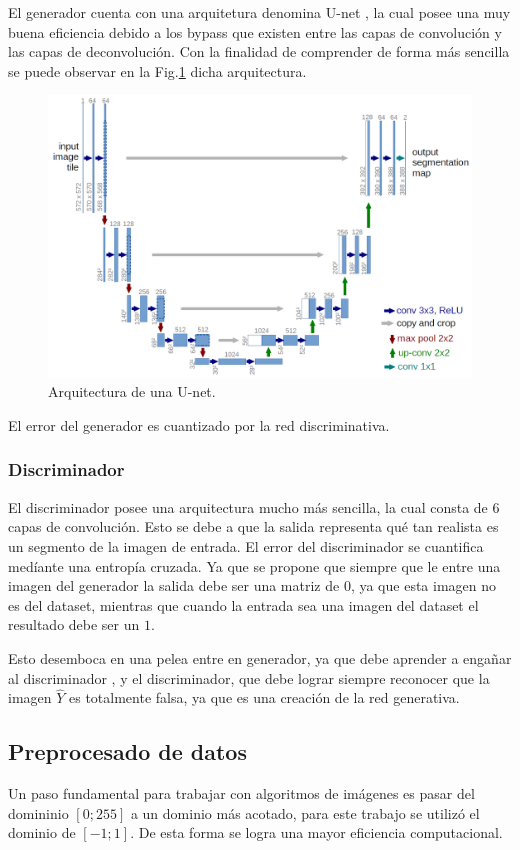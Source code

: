 \documentclass[]{IEEEtran}
\begin{document}
    El generador cuenta con una arquitetura denomina U-net \cite{U-Net},  
    la cual posee una muy buena eficiencia debido a los bypass que existen entre las capas de convolución y 
    las capas de deconvolución. Con la finalidad de comprender de forma más sencilla se puede observar 
    en la Fig.\ref{fig:u-net} dicha arquitectura.

    \begin{figure}
        \centering
        \includegraphics[width=.4\textwidth]{Imgs/u-net-architecture.png}
        \caption{Arquitectura de una U-net.}
        \label{fig:u-net}
    \end{figure}

    El error del generador es cuantizado por la red discriminativa.

    \subsubsection{Discriminador}

    El discriminador posee una arquitectura mucho más sencilla, la cual consta de $6$ capas de convolución.
    Esto se debe a que la salida representa qué tan realista es un segmento de la imagen de entrada. 
    El error del discriminador se cuantifica medíante una entropía cruzada. Ya que 
    se propone que siempre que le entre una imagen del generador la salida debe ser una matriz de $0$, ya que 
    esta imagen no es del dataset, mientras que cuando la entrada sea una imagen del dataset el resultado debe ser un $1$. 
    
    Esto desemboca en una pelea entre en generador, ya que debe aprender a engañar al discriminador 
    , y el discriminador, que debe lograr siempre reconocer que la imagen $\hat{Y}$ es totalmente falsa, ya que es una 
    creación de la red generativa.
 
    \subsection{Preprocesado de datos}

    Un paso fundamental para trabajar con algoritmos de imágenes es pasar del domininio $[0;255]$ a 
    un dominio más acotado, para este trabajo se utilizó el dominio de $[-1;1]$. De esta forma se logra 
    una mayor eficiencia computacional.
\end{document}
